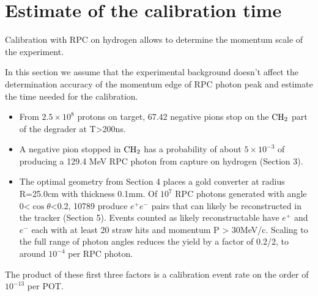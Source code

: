 
\section{Estimate of the calibration time}
Calibration with RPC on hydrogen allows to determine the momentum scale of the experiment.

In this section we assume that the experimental background doesn't affect
the determination accuracy of the momentum edge of RPC photon peak
and estimate the time needed for the calibration.

\begin{itemize}
\item 
From $ 2.5 \times 10^8 $ protons on target, 67.42 negative pions stop on the $\rm{CH_2}$ part of the degrader at T>200ns.
\item 
  A negative pion stopped in $\rm{CH_2}$ has a probability of about $ 5 \times 10^{-3} $ of producing a 129.4 MeV RPC photon from capture on hydrogen (Section 3).
\item 
The optimal geometry from Section 4 places a gold converter at radius R=25.0cm with thickness 0.1mm. Of $10^7$ RPC photons generated with angle 0<$\cos \theta$<0.2, 10789 produce $e^+ e^-$ pairs that can likely be reconstructed in the tracker (Section 5). Events counted as likely reconstructable have $e^+$ and $e^-$ each with at least 20 straw hits and momentum P > 30MeV/c. Scaling to the full range of photon angles reduces the yield by a factor of 0.2/2, to around $10^{-4}$  per RPC photon. 
\end{itemize}
The product of these first three factors is a calibration event rate on the order of $10^{-13} $ per POT.


